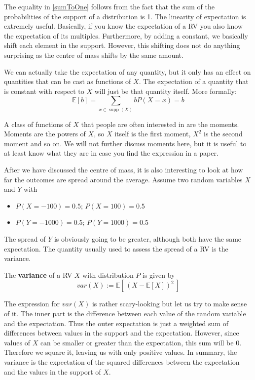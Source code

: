 \documentclass[a4paper,11pt,leqno]{report}
\newcommand{\supp}{\operatorname{supp}}
\newcommand{\E}{\mathbb{E}}
\begin{document}
The equality in \eqref{sumToOne} follows from the fact that the sum of the probabilities of the support of a distribution is 1.
The linearity of expectation is extremely useful. Basically, if you know the expectation of a RV you also know the 
expectation of its multiples. Furthermore, by adding a constant, we basically shift each element in the support. However, this shifting
does not do anything surprising as the centre of mass shifts by the same amount.

We can actually take the expectation of any quantity, but it only has an effect on quantities that
can be cast as functions of $ X $. The expectation of a quantity that is constant with respect to $ X $ will just be that
quantity itself. More formally:
\begin{equation}
\E[b] = \sum_{x \in \supp(X)} b P(X=x) = b
\end{equation}

A class of functions of $ X $ that people are often interested in are
the moments. Moments are the powers of $ X $, so $ X $ itself is the
first moment, $ X^{2} $ is the second moment and so on. We will not
further discuss moments here, but it is useful to at least know what
they are in case you find the expression in a paper.

\medskip
After we have discussed the centre of mass, it is also interesting to look at how far the outcomes are spread around the average. Assume two random variables $ X $ and $ Y $ with
\begin{itemize}
\item $ P(X=-100) = 0.5 $; $ P(X=100) = 0.5 $
\item $ P(Y=-1000) = 0.5 $; $ P(Y=1000) = 0.5 $
\end{itemize}
The spread of $ Y $ is obviously going to be greater, although both have the same expectation. The quantity usually used to assess
the spread of a RV is the variance.

\begin{Definition}[Variance]
The \textbf{variance} of a RV $ X $ with distribution $ P $ is given by
$$ var(X) := \E[\, (X - \E[X])^{2} \, ] $$
\end{Definition}

The expression for $ var(X) $ is rather scary-looking but let us try to make sense of it. The inner part is the difference between
each value of the random variable and the expectation. Thus the outer expectation is just a weighted sum of differences between 
values in the support and the expectation. However, since values of $ X $ can be smaller or greater than the expectation, this
sum will be 0. Therefore we square it, leaving us with only positive values. In summary, the variance is the expectation
of the squared differences between the expectation and the values in the support of $ X $.
\end{document}

